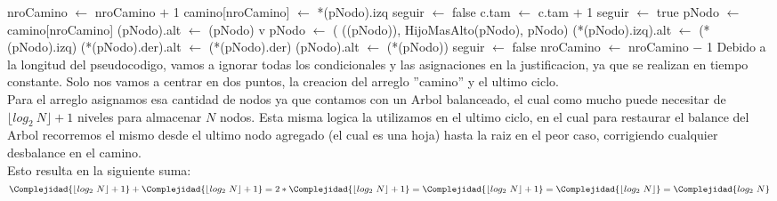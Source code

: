 \begin{Algoritmos}
{					\State nroCamino $\gets$ nroCamino $+$ 1 
					\State camino[nroCamino] $\gets$ *(pNodo).izq 
					\State seguir $\gets$ false 
				\EndIf
			\EndIf
		\EndWhile
		\State c.tam $\gets$ c.tam $+$ 1 
		\State seguir $\gets$ true 
		 
			\State pNodo $\gets$ camino[nroCamino] 
			\State *(pNodo).alt $\gets$ (pNodo) v
			 
				\State pNodo $\gets$ (
				((pNodo)), HijoMasAlto(pNodo), pNodo) 
				\State *(*(pNodo).izq).alt $\gets$ (*(pNodo).izq) 
				\State *(*(pNodo).der).alt $\gets$ (*(pNodo).der) 
				\State *(pNodo).alt $\gets$ (*(pNodo)) 
				\State seguir $\gets$ false 
			\EndIf
			\State nroCamino $\gets$ nroCamino $-$ 1 
		\EndWhile
	\EndIf
	}{}{
	Debido a la longitud del pseudocodigo, vamos a ignorar todas los condicionales y las asignaciones en la justificacion, ya que se realizan en tiempo constante. Solo nos vamos a centrar en dos puntos, la creacion del arreglo ''camino'' y el ultimo ciclo.\\
	Para el arreglo asignamos esa cantidad de nodos ya que contamos con un Arbol balanceado, el cual como mucho puede necesitar de $\lfloor log_2\ N\rfloor + 1$ niveles para almacenar $N$ nodos. Esta misma logica la utilizamos en el ultimo ciclo, en el cual para restaurar el balance del Arbol recorremos el mismo desde el ultimo nodo agregado (el cual es una hoja) hasta la raiz en el peor caso, corrigiendo cualquier desbalance en el camino.\\
	Esto resulta en la siguiente suma:\\
	$\Complejidad{\lfloor log_2\ N\rfloor + 1} + \Complejidad{\lfloor log_2\ N\rfloor + 1} =\newline
	2 * \Complejidad{\lfloor log_2\ N\rfloor + 1} =\newline
	\Complejidad{\lfloor log_2\ N\rfloor + 1} =\newline 
	\Complejidad{\lfloor log_2\ N\rfloor} = \Complejidad{log_2\ N}$
	}
	

\end{Algoritmos}
